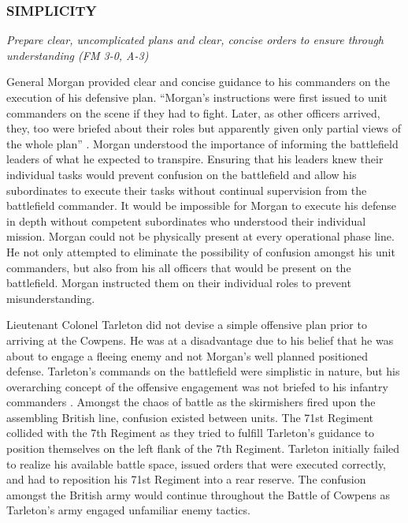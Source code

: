 \subsubsection{SIMPLICITY}

\textit{Prepare clear, uncomplicated plans and clear, concise orders to ensure
through understanding (FM 3-0, A-3)}

General Morgan provided clear and concise guidance to his commanders on the
execution of his defensive plan.  “Morgan’s instructions were first issued to
unit commanders on the scene if they had to fight.  Later, as other officers
arrived, they, too were briefed about their roles but apparently given only
partial views of the whole plan” \cite[p.54]{babits_devil_2001}.  Morgan understood the
importance of informing the battlefield leaders of what he expected to
transpire.  Ensuring that his leaders knew their individual tasks would prevent
confusion on the battlefield and allow his subordinates to execute their tasks
without continual supervision from the battlefield commander.  It would be
impossible for Morgan to execute his defense in depth without competent
subordinates who understood their individual mission.  Morgan could not be
physically present at every operational phase line.  He not only attempted to
eliminate the possibility of confusion amongst his unit commanders, but also
from his all officers that would be present on the battlefield.  Morgan
instructed them on their individual roles to prevent misunderstanding.  

Lieutenant Colonel Tarleton did not devise a simple offensive plan prior to
arriving at the Cowpens.  He was at a disadvantage due to his belief that he
was about to engage a fleeing enemy and not Morgan’s well planned positioned
defense.  Tarleton’s commands on the battlefield were simplistic in nature, but
his overarching concept of the offensive engagement was not briefed to his
infantry commanders \cite[p.321]{buchanan_road_1997}.  Amongst the chaos of battle as the
skirmishers fired upon the assembling British line, confusion existed between
units.  The 71st Regiment collided with the 7th Regiment as they tried to
fulfill Tarleton’s guidance to position themselves on the left flank of the 7th
Regiment.  Tarleton initially failed to realize his available battle space,
issued orders that were executed correctly, and had to reposition his 71st
Regiment into a rear reserve.   The confusion amongst the British army would
continue throughout the Battle of Cowpens as Tarleton’s army engaged unfamiliar
enemy tactics.  

